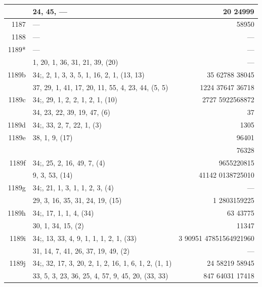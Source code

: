 \documentclass[11pt]{article}
\begin{document}
{\begin{longtable}{|r|p{8.5cm}|r|}
       & 24, 45, --- & 20 24999 \\
\hline
1187   & --- & 58950 \\
\hline
1188   & --- & --- \\
\hline
1189*  & --- & --- \\
       & 1, 20, 1, 36, 31, 21, 39, (20) & --- \\
\hline
1189b  & $34$;\; 25, 2, 1, 3, 3, 5, 1, 16, 2, 1, (13, 13) & 35 62788 38045 \\
       & 37, 29, 1, 41, 17, 20, 11, 55, 4, 23, 44, (5, 5) & 1224 37647 36718 \\
\hline
1189c  & $34$;\; 26, 29, 1, 2, 2, 1, 2, 1, (10) & 2727 5922568872 \\
       & 34, 23, 22, 39, 19, 47, (6) & 37 \\
\hline
1189d  & $34$;\; 27, 33, 2, 7, 22, 1, (3) & 1305 \\
\hline
1189e  & 38, 1, 9, (17) & 96401 \\
       & & 76328 \\
\hline
1189f  & $34$;\; 28, 25, 2, 16, 49, 7, (4) & 9655220815 \\
       & 9, 3, 53, (14) & 41142 0138725010 \\
\hline
1189g  & $34$;\; 2, 21, 1, 3, 1, 1, 2, 3, (4) & --- \\
       & 29, 3, 16, 35, 31, 24, 19, (15) & 1 2803159225 \\
\hline
1189h  & $34$;\; 2, 17, 1, 1, 4, (34) & 63 43775 \\
       & 30, 1, 34, 15, (2) & 11347 \\
\hline
1189i  & $34$;\; 3, 13, 33, 4, 9, 1, 1, 1, 2, 1, (33) & 3 90951 47851564921960 \\
       & 31, 14, 7, 41, 26, 37, 19, 49, (2) & --- \\
\hline
1189j  & $34$;\; 2, 32, 17, 3, 20, 2, 1, 2, 16, 1, 6, 1, 2, (1, 1) & 24 58219 58945 \\
       & 33, 5, 3, 23, 36, 25, 4, 57, 9, 45, 20, (33, 33) & 847 64031 17418 \\
\hline
\end{longtable}
}
\end{document}
